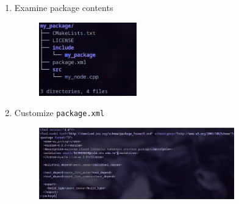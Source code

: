 \documentclass[12pt, a4paper]{article}
\begin{document}
\begin{enumerate}
\newpage
\item Examine package contents
	\begin{figure}[h]
		\centering
		\includegraphics[width=0.4\textwidth]{2/p2.3-4}
	\end{figure}
\item Customize \texttt{package.xml}
	\begin{figure}[h]
		\centering
		\includegraphics[width=0.8\textwidth]{2/p2.3-5}
	\end{figure}
\end{enumerate}
\end{document}
